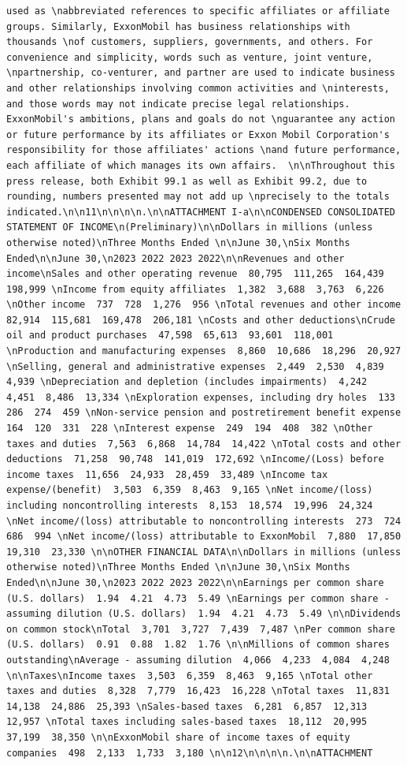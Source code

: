 \documentclass[
  letterpaper,
  DIV=11,
  numbers=noendperiod]{scrreprt}
\begin{document}
\begin{verbatim}
used as \nabbreviated references to specific affiliates or affiliate groups. Similarly, ExxonMobil has business relationships with thousands \nof customers, suppliers, governments, and others. For convenience and simplicity, words such as venture, joint venture, \npartnership, co-venturer, and partner are used to indicate business and other relationships involving common activities and \ninterests, and those words may not indicate precise legal relationships. ExxonMobil's ambitions, plans and goals do not \nguarantee any action or future performance by its affiliates or Exxon Mobil Corporation's responsibility for those affiliates' actions \nand future performance, each affiliate of which manages its own affairs.  \n\nThroughout this press release, both Exhibit 99.1 as well as Exhibit 99.2, due to rounding, numbers presented may not add up \nprecisely to the totals indicated.\n\n11\n\n\n\n.\n\nATTACHMENT I-a\n\nCONDENSED CONSOLIDATED STATEMENT OF INCOME\n(Preliminary)\n\nDollars in millions (unless otherwise noted)\nThree Months Ended \n\nJune 30,\nSix Months Ended\n\nJune 30,\n2023 2022 2023 2022\n\nRevenues and other income\nSales and other operating revenue  80,795  111,265  164,439  198,999 \nIncome from equity affiliates  1,382  3,688  3,763  6,226 \nOther income  737  728  1,276  956 \nTotal revenues and other income  82,914  115,681  169,478  206,181 \nCosts and other deductions\nCrude oil and product purchases  47,598  65,613  93,601  118,001 \nProduction and manufacturing expenses  8,860  10,686  18,296  20,927 \nSelling, general and administrative expenses  2,449  2,530  4,839  4,939 \nDepreciation and depletion (includes impairments)  4,242  4,451  8,486  13,334 \nExploration expenses, including dry holes  133  286  274  459 \nNon-service pension and postretirement benefit expense  164  120  331  228 \nInterest expense  249  194  408  382 \nOther taxes and duties  7,563  6,868  14,784  14,422 \nTotal costs and other deductions  71,258  90,748  141,019  172,692 \nIncome/(Loss) before income taxes  11,656  24,933  28,459  33,489 \nIncome tax expense/(benefit)  3,503  6,359  8,463  9,165 \nNet income/(loss) including noncontrolling interests  8,153  18,574  19,996  24,324 \nNet income/(loss) attributable to noncontrolling interests  273  724  686  994 \nNet income/(loss) attributable to ExxonMobil  7,880  17,850  19,310  23,330 \n\nOTHER FINANCIAL DATA\n\nDollars in millions (unless otherwise noted)\nThree Months Ended \n\nJune 30,\nSix Months Ended\n\nJune 30,\n2023 2022 2023 2022\n\nEarnings per common share (U.S. dollars)  1.94  4.21  4.73  5.49 \nEarnings per common share - assuming dilution (U.S. dollars)  1.94  4.21  4.73  5.49 \n\nDividends on common stock\nTotal  3,701  3,727  7,439  7,487 \nPer common share (U.S. dollars)  0.91  0.88  1.82  1.76 \n\nMillions of common shares outstanding\nAverage - assuming dilution  4,066  4,233  4,084  4,248 \n\nTaxes\nIncome taxes  3,503  6,359  8,463  9,165 \nTotal other taxes and duties  8,328  7,779  16,423  16,228 \nTotal taxes  11,831  14,138  24,886  25,393 \nSales-based taxes  6,281  6,857  12,313  12,957 \nTotal taxes including sales-based taxes  18,112  20,995  37,199  38,350 \n\nExxonMobil share of income taxes of equity companies  498  2,133  1,733  3,180 \n\n12\n\n\n\n.\n\nATTACHMENT 
\end{verbatim}
\end{document}
